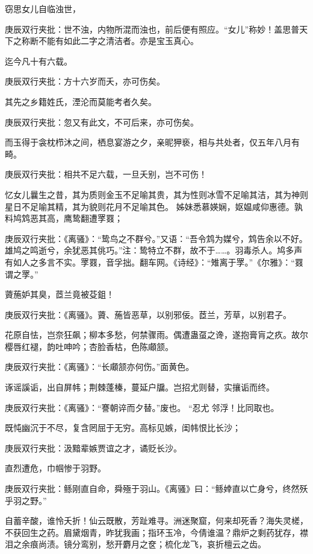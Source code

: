 \begin{parag}
    窃思女儿自临浊世，\begin{note}庚辰双行夹批：世不浊，内物所混而浊也，前后便有照应。“女儿”称妙！盖思普天下之称断不能有如此二字之清洁者。亦是宝玉真心。\end{note}迄今凡十有六载。\begin{note}庚辰双行夹批：方十六岁而夭，亦可伤矣。\end{note}其先之乡籍姓氏，湮沦而莫能考者久矣。\begin{note}庚辰双行夹批：忽又有此文，不可后来，亦可伤矣。\end{note}而玉得于衾枕栉沐之间，栖息宴游之夕，亲昵狎亵，相与共处者，仅五年八月有畸。\begin{note}庚辰双行夹批：相共不足六载，一旦夭别，岂不可伤！\end{note}忆女儿曩生之昔，其为质则金玉不足喻其贵，其为性则冰雪不足喻其洁，其为神则星日不足喻其精，其为貌则花月不足喻其色。
    姊妹悉慕媖娴，妪媪咸仰惠德。孰料鸠鸩恶其高，鹰鸷翻遭罦罬；\begin{note}庚辰双行夹批：《离骚》：“鸷鸟之不群兮。”又语：“吾令鸩为媒兮，鸩告余以不好。雄鸠之鸣逝兮，余犹恶其佻巧。”注：鸷特立不群，故不于……。羽毒杀人。鸠多声有如人之多言不实。罦罬，音孚拙。翻车网。《诗经》：“雉离于罦。”《尔雅》：“罬谓之罦。”\end{note}薋葹妒其臭，茝兰竟被芟鉏！\begin{note}庚辰双行夹批：《离骚》。薋、葹皆恶草，以别邪佞。茝兰，芳草，以别君子。\end{note}花原自怯，岂奈狂飙；柳本多愁，何禁骤雨。偶遭蛊虿之谗，遂抱膏肓之疚。故尔樱唇红褪，韵吐呻吟；杏脸香枯，色陈顑颔。
    \begin{note}庚辰双行夹批：《离骚》：“长顑颔亦何伤。”面黄色。\end{note}诼谣謑诟，出自屏帏；荆棘蓬榛，蔓延户牖。岂招尤则替，实攘诟而终。\begin{note}庚辰双行夹批：《离骚》：“謇朝谇而夕替。”废也。
        “忍尤邻浮！比同取也。\end{note}既忳幽沉于不尽，复含罔屈于无穷。高标见嫉，闺帏恨比长沙；\begin{note}庚辰双行夹批：汲黯辈嫉贾谊之才，谲贬长沙。\end{note}
    直烈遭危，巾帼惨于羽野。\begin{note}庚辰双行夹批：鲧刚直自命，舜殛于羽山。《离骚》曰：“鲧婞直以亡身兮，终然殀乎羽之野。”\end{note}自蓄辛酸，谁怜夭折！仙云既散，芳趾难寻。洲迷聚窟，何来却死香？海失灵槎，不获回生之药。眉黛烟青，昨犹我画；指环玉冷，今倩谁温？鼎炉之剩药犹存，襟泪之余痕尚渍。镜分鸾别，愁开麝月之奁；梳化龙飞，哀折檀云之齿。

\end{parag}
